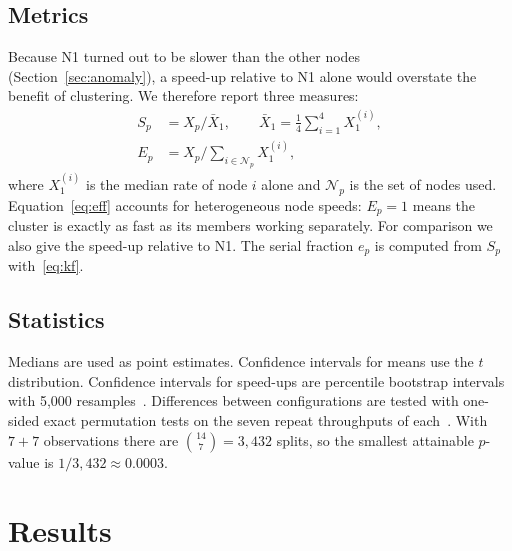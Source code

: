\documentclass[conference,10pt]{IEEEtran}
\begin{document}
\subsection{Metrics}
Because N1 turned out to be slower than the other nodes (Section~\ref{sec:anomaly}), a speed-up relative to N1 alone would overstate the benefit of clustering. We therefore report three measures:
\begin{align}
S_p &= X_p / \bar{X}_1, \qquad \bar{X}_1 = \tfrac{1}{4}\textstyle\sum_{i=1}^{4} X^{(i)}_1, \\
E_p &= X_p \Big/ \textstyle\sum_{i \in \mathcal{N}_p} X^{(i)}_1, \label{eq:eff}
\end{align}
where $X^{(i)}_1$ is the median rate of node $i$ alone and $\mathcal{N}_p$ is the set of nodes used. Equation~\eqref{eq:eff} accounts for heterogeneous node speeds: $E_p = 1$ means the cluster is exactly as fast as its members working separately. For comparison we also give the speed-up relative to N1. The serial fraction $e_p$ is computed from $S_p$ with~\eqref{eq:kf}.

\subsection{Statistics}
Medians are used as point estimates. Confidence intervals for means use the $t$ distribution. Confidence intervals for speed-ups are percentile bootstrap intervals with 5{,}000 resamples~\cite{bootstrap}. Differences between configurations are tested with one-sided exact permutation tests on the seven repeat throughputs of each~\cite{permutation}. With $7+7$ observations there are $\binom{14}{7} = 3{,}432$ splits, so the smallest attainable $p$-value is $1/3{,}432 \approx 0.0003$.

\section{Results}\label{sec:results}
\end{document}
